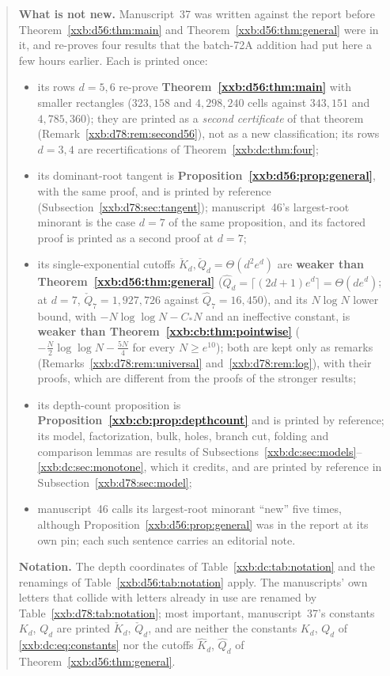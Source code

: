 \documentclass[11pt,a4paper]{article}
\numberwithin{equation}{section}
\theoremstyle{definition}
\theoremstyle{remark}
\theoremstyle{plain}
\begin{document}
\begin{quote}
\smallskip
\textbf{What is not new.}  Manuscript~37 was written against the report
before Theorem~\ref{xxb:d56:thm:main} and Theorem~\ref{xxb:d56:thm:general}
were in it, and re-proves four results that the batch-72A addition had put
here a few hours earlier.  Each is printed once:
\begin{itemize}[leftmargin=1.4em,itemsep=1pt]
\item its rows $d=5,6$ re-prove \textbf{Theorem~\ref{xxb:d56:thm:main}} with
 smaller rectangles ($323{,}158$ and $4{,}298{,}240$ cells against
 $343{,}151$ and $4{,}785{,}360$); they are printed as a \emph{second
 certificate} of that theorem (Remark~\ref{xxb:d78:rem:second56}), not as a
 new classification; its rows $d=3,4$ are recertifications of
 Theorem~\ref{xxb:dc:thm:four};
\item its dominant-root tangent is \textbf{Proposition~\ref{xxb:d56:prop:general}},
 with the same proof, and is printed by reference
 (Subsection~\ref{xxb:d78:sec:tangent}); manuscript~46's largest-root
 minorant is the case $d=7$ of the same proposition, and its factored proof
 is printed as a second proof at $d=7$;
\item its single-exponential cutoffs $\check K_d,\check Q_d=\Theta(d^2e^d)$ are
 \textbf{weaker than Theorem~\ref{xxb:d56:thm:general}}
 ($\widehat Q_d=\lceil(2d+1)e^d\rceil=\Theta(de^d)$; at $d=7$,
 $\check Q_7=1{,}927{,}726$ against $\widehat Q_7=16{,}450$), and its
 $N\log N$ lower bound, with $-N\log\log N-C_\ast N$ and an ineffective
 constant, is \textbf{weaker than Theorem~\ref{xxb:cb:thm:pointwise}}
 ($-\tfrac N2\log\log N-\tfrac{5N}4$ for every $N\ge e^{10}$); both are kept
 only as remarks (Remarks~\ref{xxb:d78:rem:universal}
 and~\ref{xxb:d78:rem:log}), with their proofs, which are different from the
 proofs of the stronger results;
\item its depth-count proposition is \textbf{Proposition~\ref{xxb:cb:prop:depthcount}}
 and is printed by reference; its model, factorization, bulk, holes,
 branch cut, folding and comparison lemmas are results of
 Subsections~\ref{xxb:dc:sec:models}--\ref{xxb:dc:sec:monotone}, which it
 credits, and are printed by reference in
 Subsection~\ref{xxb:d78:sec:model};
\item manuscript~46 calls its largest-root minorant ``new'' five times,
 although Proposition~\ref{xxb:d56:prop:general} was in the report at its own
 pin; each such sentence carries an editorial note.
\end{itemize}

\smallskip
\textbf{Notation.}  The depth coordinates of
Table~\ref{xxb:dc:tab:notation} and the renamings of
Table~\ref{xxb:d56:tab:notation} apply.  The manuscripts' own letters that
collide with letters already in use are renamed by
Table~\ref{xxb:d78:tab:notation}; most important, manuscript~37's
constants $K_d$, $Q_d$ are printed $\check K_d$, $\check Q_d$, and are neither
the constants $K_d$, $Q_d$ of \eqref{xxb:dc:eq:constants} nor the cutoffs
$\widehat K_d$, $\widehat Q_d$ of Theorem~\ref{xxb:d56:thm:general}.
\end{quote}
\end{document}
